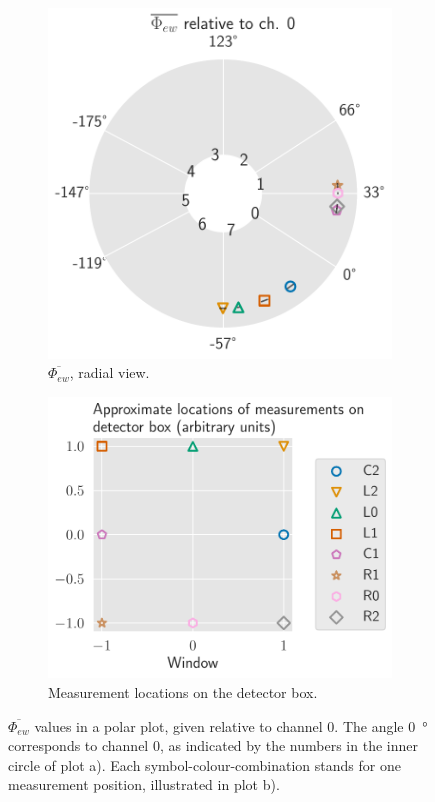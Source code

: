      \begin{figure}[h!]
    \centering
    \begin{subfigure}{.5\textwidth}
      \centering
      \includegraphics[width=\textwidth]{pictures/phi-ew-radial.pdf}
      \caption{$\overline{\Phi_{ew}}$, radial view.}
      \label{fig:phi-ew_polar}
    \end{subfigure}%
    \begin{subfigure}{.5\textwidth}
      \centering
      \includegraphics[width=\textwidth]{pictures/locations.pdf}
      \caption{Measurement locations on the detector box.}
      \label{fig:locations}
    \end{subfigure}
    \caption{$\overline{\Phi_{ew}}$ values in a polar plot, given relative to channel 0. The angle \SI{0}{\degree} corresponds to channel 0, as indicated by the numbers in the inner circle of plot a). Each symbol-colour-combination stands for one measurement position, illustrated in plot b).}
    \label{fig:phi-ew}
    \end{figure}
    
